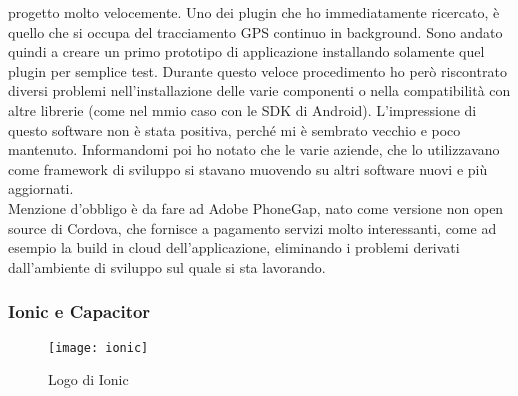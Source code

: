 progetto molto velocemente. Uno dei plugin che ho immediatamente ricercato, è quello che si occupa del tracciamento
GPS continuo in \gls{background}. Sono andato quindi a creare un primo prototipo di applicazione installando solamente
quel plugin per semplice test. Durante questo veloce procedimento ho però riscontrato diversi problemi
nell'installazione delle varie componenti o nella compatibilità con altre librerie (come nel mmio caso con le
\gls{SDK} di Android). L'impressione di questo software non è stata positiva, perché mi è sembrato vecchio e poco
mantenuto. Informandomi poi ho notato che le varie aziende, che lo utilizzavano come framework di sviluppo si stavano
muovendo su altri software nuovi e più aggiornati.\\
Menzione d'obbligo è da fare ad Adobe PhoneGap, nato come versione non \gls{open source} di Cordova, che fornisce a
pagamento servizi molto interessanti, come ad esempio la build in cloud dell'applicazione, eliminando i problemi
derivati dall'ambiente di sviluppo sul quale si sta lavorando.

\subsubsection{Ionic e Capacitor}

\begin{figure}[h]
	\begin{center}
		\texttt{[image: ionic]}
		\caption{Logo di Ionic}
	\end{center}
\end{figure}

